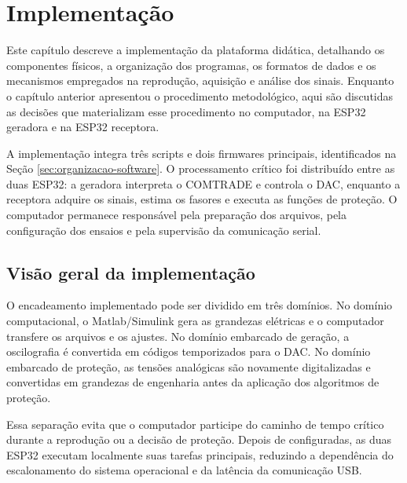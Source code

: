 \chapter{Implementação}

Este capítulo descreve a implementação da plataforma didática, detalhando os componentes físicos, a organização dos programas, os formatos de dados e os mecanismos empregados na reprodução, aquisição e análise dos sinais. Enquanto o capítulo anterior apresentou o procedimento metodológico, aqui são discutidas as decisões que materializam esse procedimento no computador, na ESP32 geradora e na ESP32 receptora.

A implementação integra três scripts e dois firmwares principais, identificados na Seção \ref{sec:organizacao-software}. O processamento crítico foi distribuído entre as duas ESP32: a geradora interpreta o COMTRADE e controla o DAC, enquanto a receptora adquire os sinais, estima os fasores e executa as funções de proteção. O computador permanece responsável pela preparação dos arquivos, pela configuração dos ensaios e pela supervisão da comunicação serial.

\section{Visão geral da implementação}

O encadeamento implementado pode ser dividido em três domínios. No domínio computacional, o Matlab/Simulink gera as grandezas elétricas e o computador transfere os arquivos e os ajustes. No domínio embarcado de geração, a oscilografia é convertida em códigos temporizados para o DAC. No domínio embarcado de proteção, as tensões analógicas são novamente digitalizadas e convertidas em grandezas de engenharia antes da aplicação dos algoritmos de proteção.

Essa separação evita que o computador participe do caminho de tempo crítico durante a reprodução ou a decisão de proteção. Depois de configuradas, as duas ESP32 executam localmente suas tarefas principais, reduzindo a dependência do escalonamento do sistema operacional e da latência da comunicação USB.

